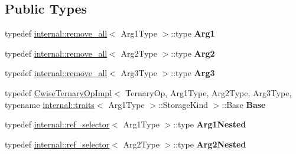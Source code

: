 \subsection*{Public Types}
\begin{DoxyCompactItemize}
\item 
\mbox{\label{class_eigen_1_1_cwise_ternary_op_aa4563b92c245f9f0a75849f42202199d}} 
typedef \mbox{\hyperlink{struct_eigen_1_1internal_1_1remove__all}{internal\+::remove\+\_\+all}}$<$ Arg1\+Type $>$\+::type {\bfseries Arg1}
\item 
\mbox{\label{class_eigen_1_1_cwise_ternary_op_a9d8a0e6d666fc184102738e64d730faf}} 
typedef \mbox{\hyperlink{struct_eigen_1_1internal_1_1remove__all}{internal\+::remove\+\_\+all}}$<$ Arg2\+Type $>$\+::type {\bfseries Arg2}
\item 
\mbox{\label{class_eigen_1_1_cwise_ternary_op_a2701e2558b2337fe322a86a9275abb70}} 
typedef \mbox{\hyperlink{struct_eigen_1_1internal_1_1remove__all}{internal\+::remove\+\_\+all}}$<$ Arg3\+Type $>$\+::type {\bfseries Arg3}
\item 
\mbox{\label{class_eigen_1_1_cwise_ternary_op_af957246bf43f609178608885582b2579}} 
typedef \mbox{\hyperlink{class_eigen_1_1_cwise_ternary_op_impl}{Cwise\+Ternary\+Op\+Impl}}$<$ Ternary\+Op, Arg1\+Type, Arg2\+Type, Arg3\+Type, typename \mbox{\hyperlink{struct_eigen_1_1internal_1_1traits}{internal\+::traits}}$<$ Arg1\+Type $>$\+::Storage\+Kind $>$\+::Base {\bfseries Base}
\item 
\mbox{\label{class_eigen_1_1_cwise_ternary_op_a0843a161ab52e659474482a58490c446}} 
typedef \mbox{\hyperlink{struct_eigen_1_1internal_1_1ref__selector}{internal\+::ref\+\_\+selector}}$<$ Arg1\+Type $>$\+::type {\bfseries Arg1\+Nested}
\item 
\mbox{\label{class_eigen_1_1_cwise_ternary_op_ab6d00b9e39860793557efff176a76123}} 
typedef \mbox{\hyperlink{struct_eigen_1_1internal_1_1ref__selector}{internal\+::ref\+\_\+selector}}$<$ Arg2\+Type $>$\+::type {\bfseries Arg2\+Nested}
\item 
\mbox{\label{class_eigen_1_1_cwise_ternary_op_a293ceb5e15a473f006ce0c81d4116ba8}} 

\end{DoxyCompactItemize}
